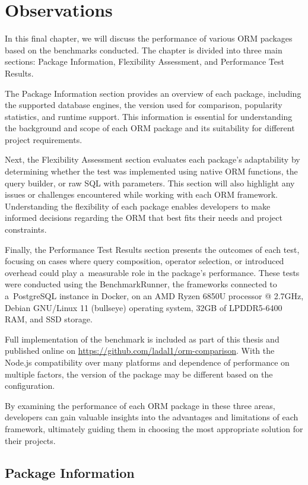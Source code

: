 \chapter{Observations}\label{ch:observations}

In this final chapter, we will discuss the performance of various ORM packages
based on the benchmarks conducted. The chapter is divided into three main
sections: Package Information, Flexibility Assessment, and Performance Test
Results.

The Package Information section provides an overview of each package, including
the supported database engines, the version used for comparison, popularity
statistics, and runtime support. This information is essential for understanding
the background and scope of each ORM package and its suitability for different
project requirements.

Next, the Flexibility Assessment section evaluates each package's adaptability
by determining whether the test was implemented using native ORM functions, the
query builder, or raw SQL with parameters. This section will also highlight any
issues or challenges encountered while working with each ORM framework.
Understanding the flexibility of each package enables developers to make
informed decisions regarding the ORM that best fits their needs and project
constraints.

Finally, the Performance Test Results section presents the outcomes of each
test, focusing on cases where query composition, operator selection, or
introduced overhead could play a~measurable role in the package's performance.
These tests were conducted using the BenchmarkRunner, the frameworks connected
to a~PostgreSQL instance in Docker, on an AMD Ryzen 6850U processor @ 2.7GHz,
Debian GNU/Linux 11 (bullseye) operating system, 32GB of LPDDR5-6400 RAM, and
SSD storage.

Full implementation of the benchmark is included as part of this thesis and
published online on \url{https://github.com/ladal1/orm-comparison}. With the
Node.js compatibility over many platforms and dependence of performance on
multiple factors, the version of the package may be different based on the
configuration.

By examining the performance of each ORM package in these three areas,
developers can gain valuable insights into the advantages and limitations of
each framework, ultimately guiding them in choosing the most appropriate
solution for their projects.

\section{Package Information}

